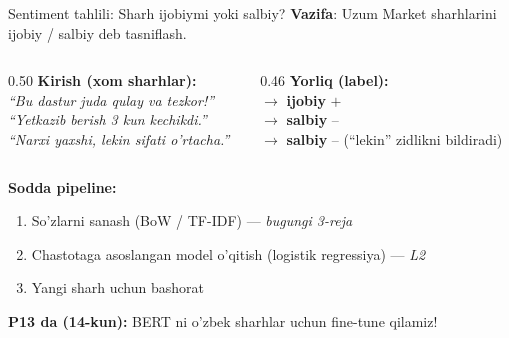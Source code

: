 \documentclass[aspectratio=169,11pt]{beamer}
\begin{document}
\begin{frame}{Sentiment tahlili: Sharh ijobiymi yoki salbiy?}
  \textbf{Vazifa}: Uzum Market sharhlarini ijobiy / salbiy deb tasniflash.
  \vspace{5pt}
  \begin{columns}[T]
    \begin{column}{0.50\textwidth}
      \textbf{Kirish (xom sharhlar):}\\[5pt]
      \small
      \textit{``Bu dastur juda qulay va tezkor!''}\\[3pt]
      \textit{``Yetkazib berish 3 kun kechikdi.''}\\[3pt]
      \textit{``Narxi yaxshi, lekin sifati o'rtacha.''}
    \end{column}
    \begin{column}{0.46\textwidth}
      \textbf{Yorliq (label):}\\[5pt]
      \small
      $\to$ \textbf{ijobiy} \textcolor{deepgreen}{\large$+$}\\[3pt]
      $\to$ \textbf{salbiy} \textcolor{deepred}{\large--}\\[3pt]
      $\to$ \textbf{salbiy} \textcolor{deepred}{\large--}
            \quad\footnotesize(``lekin'' zidlikni bildiradi)
    \end{column}
  \end{columns}
  \vspace{7pt}
  \textbf{Sodda pipeline:}
  \begin{enumerate}\small\setlength\itemsep{2pt}
    \item So'zlarni sanash (BoW / TF-IDF) --- \textit{bugungi 3-reja}
    \item Chastotaga asoslangan model o'qitish (logistik regressiya) --- \textit{L2}
    \item Yangi sharh uchun bashorat
  \end{enumerate}
  \vspace{4pt}
  \textbf{P13 da (14-kun):} BERT ni o'zbek sharhlar uchun fine-tune qilamiz!
\end{frame}
\end{document}
